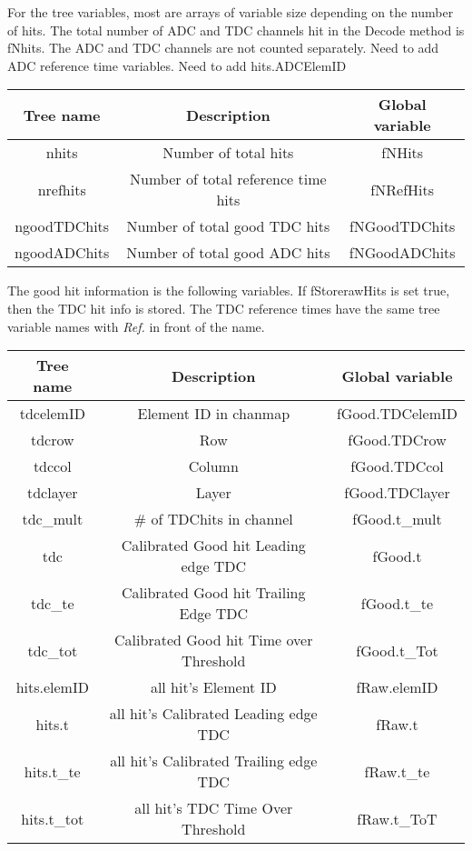 \documentclass[11pt]{article}
\begin{document}
For the tree variables, most are arrays of variable size depending on the number of hits. 
The total number of  ADC and TDC channels hit in the Decode method is fNhits. The ADC and TDC channels
are not counted separately. {\color{red} Need to add ADC reference time variables. Need to add hits.ADCElemID }
\begin{center}
	\begin{tabular}{|c|c|c|}
		\hline 
		Tree name	& Description &  Global variable\\ 
		\hline 
		nhits	& Number of total hits & fNHits  \\ 
		\hline 
nrefhits	& Number of total reference time hits & fNRefHits  \\ 
		\hline 
		ngoodTDChits	& Number of total good TDC hits & fNGoodTDChits \\ 
		\hline 
ngoodADChits	& Number of total good ADC hits & fNGoodADChits \\ 
		\hline 
\end{tabular} 
\end{center}

The good hit information is the following variables.
If fStorerawHits is set true, then the TDC hit info is stored.
The TDC reference times have the same tree variable names  with {\it Ref.} in front
of the name.
\begin{center}
\begin{tabular}{|c|c|c|}
	\hline 
	Tree name	& Description &  Global variable\\ 
\hline 
  tdcelemID 	& Element ID in chanmap  & fGood.TDCelemID  \\ 
\hline 
  tdcrow 	& Row   & fGood.TDCrow  \\ 
\hline
tdccol 	& Column   & fGood.TDCcol \\
\hline 
tdclayer	& Layer   & fGood.TDClayer \\ 
\hline 
tdc\_mult & \# of TDChits in channel & fGood.t\_mult \\
\hline 
tdc 	& Calibrated Good hit Leading edge TDC  &fGood.t  \\ 
\hline 
tdc\_te 	& Calibrated  Good hit Trailing Edge TDC  &fGood.t\_te  \\ 
\hline 
tdc\_tot 	& Calibrated  Good hit Time over Threshold  &fGood.t\_Tot  \\ 
\hline 
\hline 
hits.elemID 	&  all hit's Element ID &fRaw.elemID \\
	\hline 
	hits.t 	&  all hit's Calibrated Leading edge TDC  &fRaw.t  \\ 
	\hline 
	hits.t\_te 	& all hit's  Calibrated Trailing edge TDC &fRaw.t\_te  \\ 
	\hline 
	hits.t\_tot	&  all hit's TDC Time Over Threshold   &fRaw.t\_ToT  \\ 
	\hline 
\end{tabular} 
\end{center}
\end{document}
